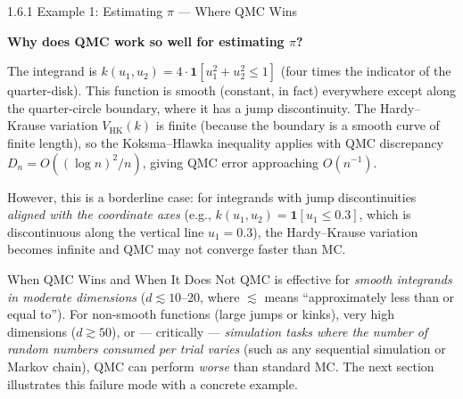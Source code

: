 \documentclass[aspectratio=169,10pt]{beamer}
\begin{document}
\begin{frame}[allowframebreaks]{1.6.1 Example 1: Estimating $\pi$ --- Where QMC Wins}
  \framebreak

  \textbf{Why does QMC work so well for estimating $\pi$?}

  The integrand is $k(u_1, u_2) = 4 \cdot \mathbf{1}[u_1^2 + u_2^2 \le 1]$
  (four times the indicator of the quarter-disk).  This function is smooth
  (constant, in fact) everywhere except along the quarter-circle boundary, where
  it has a jump discontinuity.  The Hardy--Krause variation $V_{\mathrm{HK}}(k)$
  is finite (because the boundary is a smooth curve of finite length), so the
  Koksma--Hlawka inequality applies with QMC discrepancy
  $D_n = O((\log n)^2 / n)$, giving QMC error approaching $O(n^{-1})$.

  However, this is a borderline case: for integrands with jump discontinuities
  \emph{aligned with the coordinate axes} (e.g., $k(u_1, u_2) =
  \mathbf{1}[u_1 \le 0.3]$, which is discontinuous along the vertical line
  $u_1 = 0.3$), the Hardy--Krause variation becomes infinite and QMC may not
  converge faster than MC.

  \begin{alertblock}{When QMC Wins and When It Does Not}
    QMC is effective for \emph{smooth integrands in moderate dimensions}
    ($d \lesssim 10$--20, where $\lesssim$ means ``approximately less than or
    equal to'').  For non-smooth functions (large jumps or kinks), very high
    dimensions ($d \gtrsim 50$), or --- critically --- \emph{simulation tasks
    where the number of random numbers consumed per trial varies} (such as any
    sequential simulation or Markov chain), QMC can perform \emph{worse} than
    standard MC.  The next section illustrates this failure mode with a
    concrete example.
  \end{alertblock}

\end{frame}
\end{document}
